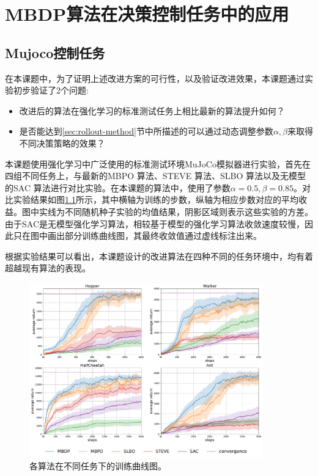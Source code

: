 
\chapter{MBDP算法在决策控制任务中的应用}

\section{Mujoco控制任务}

在本课题中，为了证明上述改进方案的可行性，以及验证改进效果，本课题通过实验初步验证了2个问题:

\begin{itemize}
    \item 改进后的算法在强化学习的标准测试任务上相比最新的算法提升如何？
    \item 是否能达到\ref{sec:rollout-method}节中所描述的可以通过动态调整参数$\alpha,\beta$来取得不同决策策略的效果？
\end{itemize}

本课题使用强化学习中广泛使用的标准测试环境MuJoCo模拟器\cite{todorov2012mujoco}进行实验，首先在四组不同任务上，与最新的MBPO \cite{janner2019trust}算法、STEVE \cite{buckman2018sample}算法、SLBO \cite{Luo2019AlgorithmicGuarantees}算法以及无模型的SAC \cite{haarnoja2018soft}算法进行对比实验。在本课题的算法中，使用了参数$\alpha=0.5, \beta=0.85$。对比实验结果如图\ref{fig:performance}所示，其中横轴为训练的步数，纵轴为相应步数对应的平均收益。图中实线为不同随机种子实验的均值结果，阴影区域则表示这些实验的方差。由于SAC是无模型强化学习算法，相较基于模型的强化学习算法收敛速度较慢，因此只在图中画出部分训练曲线图，其最终收敛值通过虚线标注出来。

根据实验结果可以看出，本课题设计的改进算法在四种不同的任务环境中，均有着超越现有算法的表现。

\begin{figure}
  \centering
  \includegraphics[width=0.9\textwidth]{figures/performance.pdf}
  \caption{各算法在不同任务下的训练曲线图。}
  \label{fig:performance}
\end{figure}

